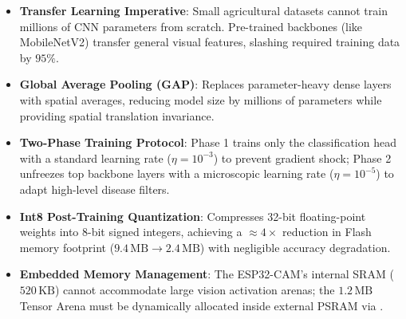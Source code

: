 \begin{takeaways}
\begin{itemize}
    \item \textbf{Transfer Learning Imperative}: Small agricultural datasets cannot train millions of CNN parameters from scratch. Pre-trained backbones (like MobileNetV2) transfer general visual features, slashing required training data by $95\%$.
    \item \textbf{Global Average Pooling (GAP)}: Replaces parameter-heavy dense layers with spatial averages, reducing model size by millions of parameters while providing spatial translation invariance.
    \item \textbf{Two-Phase Training Protocol}: Phase 1 trains only the classification head with a standard learning rate ($\eta = 10^{-3}$) to prevent gradient shock; Phase 2 unfreezes top backbone layers with a microscopic learning rate ($\eta = 10^{-5}$) to adapt high-level disease filters.
    \item \textbf{Int8 Post-Training Quantization}: Compresses 32-bit floating-point weights into 8-bit signed integers, achieving a $\approx 4\times$ reduction in Flash memory footprint ($9.4\,\text{MB} \to 2.4\,\text{MB}$) with negligible accuracy degradation.
    \item \textbf{Embedded Memory Management}: The ESP32-CAM's internal SRAM ($520\,\text{KB}$) cannot accommodate large vision activation arenas; the $1.2\,\text{MB}$ Tensor Arena must be dynamically allocated inside external PSRAM via .
\end{itemize}
\end{takeaways}

